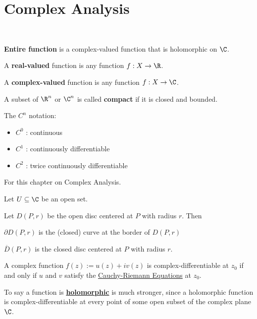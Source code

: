 \section{Complex Analysis}\label{f28d4dc}

\label{d508dc8}

\textcolor{white}{.}

\textbf{Entire function} is a complex-valued function that is holomorphic on
$\C$.

A \textbf{real-valued} function is any function $f:X\to\R$.

A \textbf{complex-valued} function is any function $f:X\to\C$.

A subset of $\R^n$ or $\C^n$ is called \textbf{compact} if it is closed and
bounded.

The $C^n$ notation:
\begin{itemize}
  \item $C^0$ : continuous
  \item $C^1$ : continuously differentiable
  \item $C^2$ : twice continuously differentiable
\end{itemize}

\label{d1055b9}

For this chapter on Complex Analysis.

Let $U\subseteq\C$ be an open set.

Let $D(P,r)$ be the open disc centered at $P$ with radius $r$. Then
\begin{enumerati}
  \item $\partial D(P,r)$ is the (closed) curve at the border of $D(P,r)$
  \item $\overline D(P,r)$ is the closed disc centered at $P$ with
  radius $r$.
\end{enumerati}

\label{d1d5d93}

A complex function $f(z):=u(z)+iv(z)$ is complex-differentiable at $z_0$ if and
only if $u$ and $v$ satisfy the \href{fb10fd3}{Cauchy-Riemann Equations} at
$z_0$.

To say a function is \href{e1e08f7}{\textbf{holomorphic}} is much stronger,
since a holomorphic function is complex-differentiable at every point of some
open subset of the complex plane $\C$.

\label{ffea0ed}

